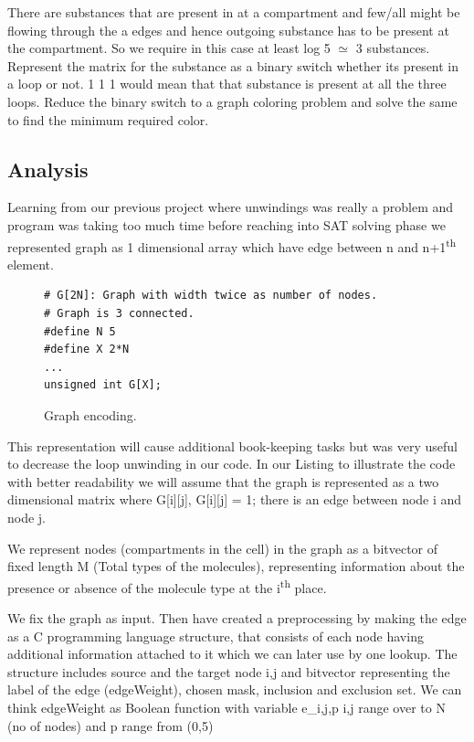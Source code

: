 \documentclass[preprint,12pt]{elsarticle}
\begin{document}
There are substances that are present in at a compartment and few/all might be flowing through the a  edges and hence outgoing substance has to be present at the compartment. So we require in this case at least log 5 $\simeq$ 3 substances. 
Represent the matrix for the substance as a binary switch whether its present in a loop or not. 1 1 1 would mean that that substance is present at all the three loops. Reduce the binary switch to a graph coloring problem and solve the same to find the minimum required color. 

\subsection{Analysis}
Learning from our previous project where unwindings was really a problem and program was taking too much time before reaching into SAT solving phase we represented graph as 1 dimensional array which have edge between n and n+1\textsuperscript{th} element. 

\begin{figure}[ht]
\begin{verbatim}
# G[2N]: Graph with width twice as number of nodes.
# Graph is 3 connected.
#define N 5
#define X 2*N
...
unsigned int G[X];   
\end{verbatim}
\caption{Graph encoding.}
\label{code:motivate}
\end{figure}
 
 
 
This representation will cause additional book-keeping tasks but was very useful to decrease the loop unwinding in our code. In our Listing to illustrate the code with better readability we will assume that the graph is represented as a two dimensional matrix where G[i][j], G[i][j] = 1; there is an edge between node i and node j.


We represent nodes (compartments in the cell) in the graph as a bitvector of fixed length M (Total types of the molecules), representing information about the presence or absence of the molecule type at the i\textsuperscript{th} place.

We fix the graph as input. Then have created a preprocessing by making the edge as a C programming language structure, that consists of each node having additional information attached to it which we can later use by one lookup. The structure includes source and the target node i,j and bitvector representing the label of the edge (edgeWeight), chosen mask, inclusion and exclusion set. 
We can think edgeWeight as Boolean function with variable e\_{i,j,p} i,j range over to N (no of nodes) and p range from (0,5)
\end{document}
